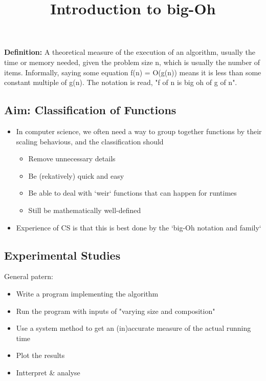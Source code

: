 \documentclass{article}
\begin{document}
\title{Introduction to big-Oh}
\maketitle

\begin{flushleft}
\textbf{Definition:} A theoretical measure of the execution of an algorithm, usually the time or memory needed, given the problem size n, which is usually the number of items. Informally, saying some equation f(n) = O(g(n)) means it is less than some constant multiple of g(n). The notation is read, "f of n is big oh of g of n".
\end{flushleft}

\begin{flushleft}
\section{Aim: Classification of Functions}
\begin{itemize}
	\item In computer science, we often need a way to group together functions by their scaling behavious, and the classification should
	\begin{itemize}
		\item Remove unnecessary details
		\item Be (rekatively) quick and easy
		\item Be able to deal with `weir` functions that can happen for runtimes
		\item Still be mathematically well-defined
	\end{itemize}
	\item Experience of CS is that this is best done by the `big-Oh notation and family`
\end{itemize}
\end{flushleft}

\begin{flushleft}
\section{Experimental Studies}
General patern:
\begin{itemize}
	\item Write a program implementing the algorithm
	\item Run the program with inputs of "varying size and composition"
	\item Use a system method to get an (in)accurate measure of the actual running time
	\item Plot the results
	\item Intterpret \& analyse
\end{itemize}
\end{flushleft}
\end{document}
